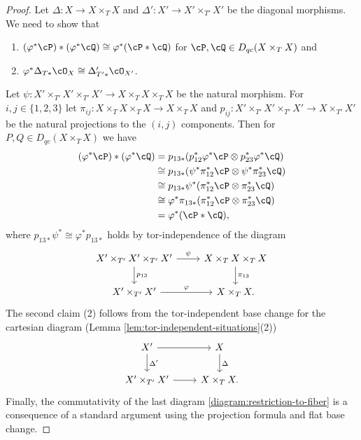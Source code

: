 \documentclass[12pt]{amsart}
\numberwithin{equation}{section}
\theoremstyle{plain}
\theoremstyle{definition}
\begin{document}
\begin{proof}
    Let $\Delta \colon X \to X \times_T X$ and $\Delta' \colon X' \to X' \times_{T'} X'$ be the diagonal morphisms.
    We need to show that
    \begin{enumerate}
        \item $(\varphi^* \cP) * (\varphi^* \cQ) \cong \varphi^*(\cP * \cQ)$ for $\cP, \cQ \in D_{qc}(X \times_T X)$ and
        \item $\varphi^*\Delta_{T*}\cO_X \cong \Delta'_{T'*}\cO_{X'}$.
    \end{enumerate}
    Let $\psi \colon X' \times_{T'} X' \times_{T'} X' \to X \times_T X \times_T X$ be the natural morphism.
    For $i, j \in \{1, 2, 3\}$ let $\pi_{ij} \colon X \times_T X \times_T X \to X \times_T X$ and $p_{ij} \colon X' \times_{T'} X' \times_{T'} X' \to X \times_{T'} X'$ be the natural projections to the $(i, j)$ components.
    Then for $P, Q \in D_{qc}(X \times_T X)$ we have
    \begin{align}
        (\varphi^* \cP) * (\varphi^* \cQ) & =p_{13*}(p_{12}^* \varphi^* \cP \otimes p_{23}^* \varphi^* \cQ)   \\
                                          & \cong p_{13*}(\psi^*\pi_{12}^* \cP \otimes \psi^* \pi_{23}^* \cQ) \\
                                          & \cong p_{13*}\psi^*(\pi_{12}^* \cP \otimes \pi_{23}^* \cQ)        \\
                                          & \cong \varphi^*\pi_{13*}(\pi_{12}^* \cP \otimes \pi_{23}^* \cQ)   \\
                                          & = \varphi^*(\cP * \cQ),
    \end{align}
    where $p_{13*}\psi^* \cong \varphi^*p_{13*}$ holds by tor-independence of the diagram
    \[
        \begin{tikzcd}
            X' \times_{T'} X' \times_{T'} X' \ar[r, "\psi"] \ar[d, "p_{13}"] &  X \times_{T} X \times_{T} X \ar[d, "\pi_{13}"] \\
            X' \times_{T'} X' \ar[r, "\varphi"] & X \times_{T} X.
        \end{tikzcd}
    \]
    The second claim (2) follows from the tor-independent base change for the cartesian diagram (Lemma \ref{lem:tor-independent-situations}(2))
    \[
        \begin{tikzcd}
            X' \ar[r] \ar[d, "\Delta'"] &  X \ar[d, "\Delta"] \\
            X' \times_{T'} X' \ar[r] & X \times_{T} X.
        \end{tikzcd}
    \]
    Finally, the commutativity of the last diagram \eqref{diagram:restriction-to-fiber} is a consequence of a standard argument using the projection formula and flat base change.
\end{proof}
\end{document}
